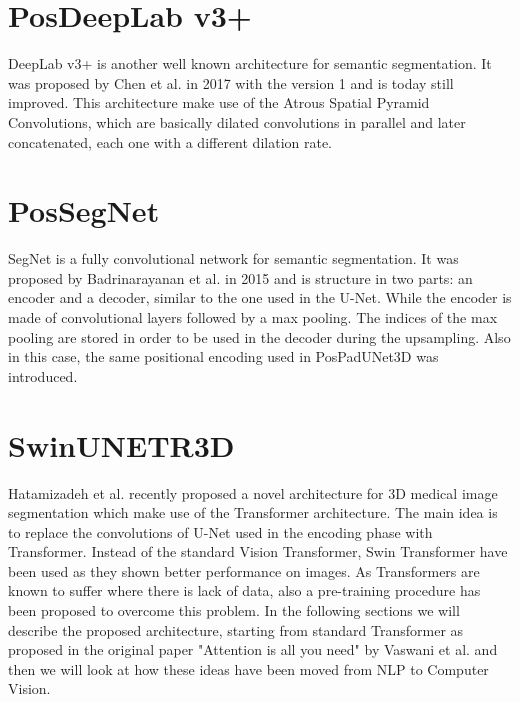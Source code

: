 \section{PosDeepLab v3+}
DeepLab v3+ is another well known architecture for semantic segmentation. It
was proposed by Chen et al. in 2017 with the version 1 and is today still
improved. This architecture make use of the Atrous Spatial Pyramid Convolutions,
which are basically dilated convolutions in parallel and later concatenated,
each one with a different dilation rate.

\section{PosSegNet}
SegNet is a fully convolutional network for semantic segmentation. It was
proposed by Badrinarayanan et al. in 2015 and is structure in two parts: an
encoder and a decoder, similar to the one used in the U-Net. While the encoder
is made of convolutional layers followed by a max pooling. The indices of the
max pooling are stored in order to be used in the decoder during the upsampling.
Also in this case, the same positional encoding used in PosPadUNet3D was introduced.

\section{SwinUNETR3D}
Hatamizadeh et al. recently proposed a novel architecture for 3D medical image
segmentation which make use of the Transformer architecture. The main idea is to
replace the convolutions of U-Net used in the encoding phase with Transformer.
Instead of the standard Vision Transformer, Swin Transformer have been used as
they shown better performance on images. As Transformers are known to suffer
where there is lack of data, also a pre-training procedure has been proposed to
overcome this problem. In the following sections we will describe the proposed
architecture, starting from standard Transformer as proposed in the original
paper "Attention is all you need" by Vaswani et al. and then we will look at how
these ideas have been moved from NLP to Computer Vision.

